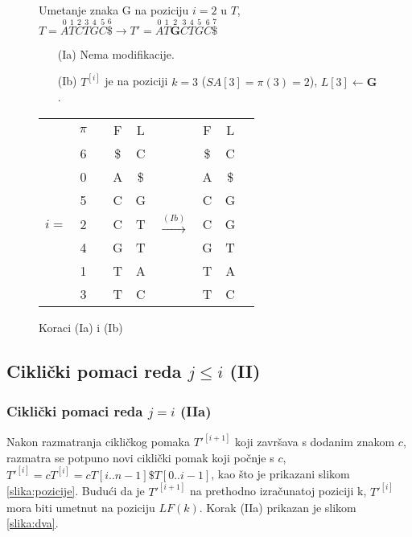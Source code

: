 \documentclass{ferseminar}
\begin{document}
\begin{figure}[H]


\begin{minipage}{0.5\textwidth}
\footnotesize
Umetanje znaka G na poziciju $i=2$ u $T$, 
$
	T=\overset{0}{A}	\overset{1}{T} \overset{2}{C} \overset{3}{T}	\overset{4}{G}
	\overset{5}{C}	\overset{6}{\$} \rightarrow		
	T'=\overset{0}{A}	\overset{1}{T}	\overset{2}{\boldsymbol{G}}  \overset{3}{C} \overset{4}{T}	\overset{5}{G}
	\overset{6}{C}	\overset{7}{\$} 	
$
\begin{itemize}
  \item[(Ia)] Nema modifikacije.
  \item[(Ib)] $T^{[i]}$ je na poziciji $k=3$ ($SA[3]=\pi(3)=2$), $L[3]\leftarrow \boldsymbol{G}$.
\end{itemize}
\end{minipage} \hfill
\begin{minipage}{0.45\textwidth}
\begin{tabular}{cccc|ccc|cc}
	& $\pi$ &  & F & L & & F & L \\
	\cline{2-2} \cline{4-5} \cline{7-8}
	& 6 & & \$ & C & & \$ & C \\
	& 0 & & A & \$ & & A & \$ \\
	& 5 & & C & G & & C & G \\
	\cline{1-8}
	\multicolumn{1}{|c}{$i=$}& 2 & & C & T & $\stackrel{(Ib)}{\longrightarrow}$ & C & \multicolumn{1}{c|}{G} \\
	\cline{1-8}
	& 4 & & G & T & & G & T \\
	& 1 & & T & A & & T & A \\
	& 3 & & T & C & & T & C 
\end{tabular}

\end{minipage}
\caption{Koraci (Ia) i (Ib)}
\label{slika:jedan}
\end{figure}

\subsection{Ciklički pomaci reda $j\leq i$ (II)}
\subsubsection{Ciklički pomaci reda $j=i$ (IIa)}
Nakon razmatranja cikličkog pomaka $T'^{[i+1]}$ koji završava s dodanim znakom $c$, razmatra se potpuno novi ciklički pomak koji počnje s $c$, $T'^{[i]}=cT^{[i]}=cT[i..n-1]\$T[0..i-1]$, kao što je prikazani slikom \ref{slika:pozicije}. Budući da je $T'^{[i+1]}$ na prethodno izračunatoj poziciji k, $T'^{[i]}$ mora biti umetnut na poziciju $LF(k)$. Korak (IIa) prikazan je slikom \ref{slika:dva}. 
\end{document}
